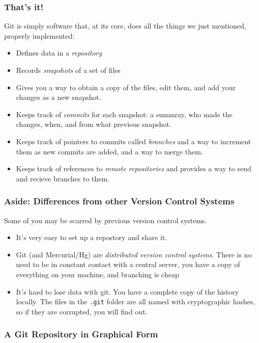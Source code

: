\documentclass{beamer}
\begin{document}
\begin{frame}[fragile]
\frametitle{That's it!}
Git is simply software that, at its core, does all the things we just mentioned, properly implemented:
\begin{itemize}
\item Defines data in a \emph{repository}
\item Records \emph{snapshots} of a set of files
\item Gives you a way to obtain a copy of the files, edit them, and add your changes as a new snapshot.
\item Keeps track of \emph{commits} for each snapshot: a summray, who made the changes, when, and from what previous snapshot.
\item Keeps track of pointers to commits called \emph{branches} and a way to increment them as new commits are added, and a way to merge them.
\item Keeps track of references to \emph{remote repositories} and provides a way to send and recieve branches to them.
\end{itemize}
\end{frame}

\begin{frame}[fragile]
\frametitle{Aside: Differences from other Version Control Systems}
Some of you may be scarred by previous version control systems.
\begin{itemize}
\item It's very easy to set up a repostory and share it.
\item Git (and Mercurial/Hg) are \emph{distributed version control systems}. There is no need to be in constant contact with a central server, you have a copy of everything on your machine, and branching is cheap
\item It's hard to lose data with git. You have a complete copy of the history locally. The files in the \texttt{.git} folder are all named with cryptographic hashes, so if they are corrupted, you will find out.
\end{itemize}
\end{frame}

\begin{frame}[fragile]
\frametitle{A Git Repository in Graphical Form}

\end{frame}
\end{document}

